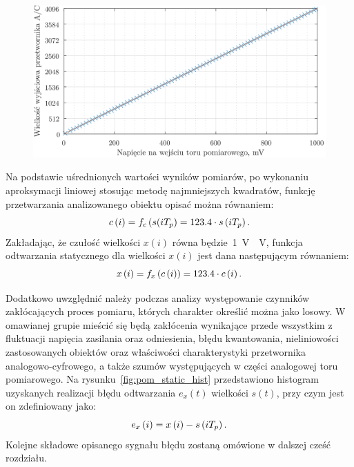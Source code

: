 \begin{figure}[htb!]
\begin{center}
\includegraphics{obrazki/static_adcout}
\end{center}
\end{figure}

Na podstawie uśrednionych wartości wyników pomiarów, po wykonaniu aproksymacji liniowej stosując metodę najmniejszych kwadratów, funkcję przetwarzania analizowanego obiektu opisać można równaniem:
\begin{equation}
c \left(i\right) = f_{c} \left(s(iT_{p}\right) = 123.4 \cdot s \left(iT_{p}\right) \label{eq:pom_func_static}.
\end{equation}
Zakładając, że czułość wielkości $x(i)$ równa będzie~\qty{1}{V \per V}, funkcja odtwarzania statycznego dla wielkości $x(i)$ jest dana następującym równaniem:
\begin{equation}
x \left(i\right) = f_{x} \left(c \left(i\right)\right) = 123.4 \cdot c \left(i\right) \label{eq:pom_funx_static}.
\end{equation}

Dodatkowo uwzględnić należy podczas analizy występowanie czynników zakłócających proces pomiaru, których charakter określić można jako losowy. W omawianej grupie mieścić się będą zakłócenia wynikające przede wszystkim z fluktuacji napięcia zasilania oraz odniesienia, błędu kwantowania, nieliniowości zastosowanych obiektów oraz właściwości charakterystyki przetwornika analogowo-cyfrowego, a także szumów występujących w części analogowej toru pomiarowego. Na rysunku~\ref{fig:pom_static_hist} przedstawiono histogram uzyskanych realizacji błędu odtwarzania $e_{x}(t)$ wielkości $s(t)$, przy czym jest on zdefiniowany jako:
\begin{equation}
e_{x} \left(i\right) = x \left(i\right) - s \left(iT_{p}\right) \label{eq:pom_funx_error}.
\end{equation}
Kolejne składowe opisanego sygnału błędu zostaną omówione w dalszej cześć rozdziału.

